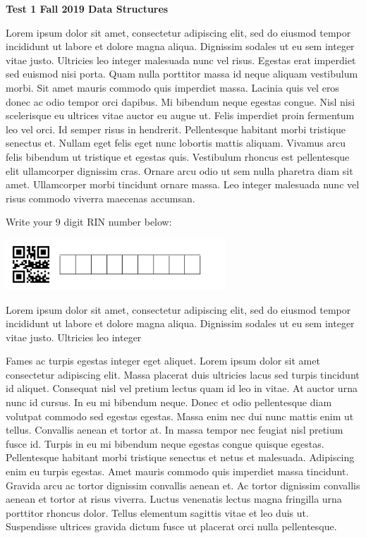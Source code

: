 \documentclass[12pt]{article}
\begin{document}
\newpage

\noindent
{\Large \bf Test 1 \hfill Fall 2019 Data Structures}

\vspace{0.1in}

Lorem ipsum dolor sit amet, consectetur adipiscing elit, sed do eiusmod tempor incididunt ut labore et dolore magna aliqua. Dignissim sodales ut eu sem integer vitae justo. Ultricies leo integer malesuada nunc vel risus. Egestas erat imperdiet sed euismod nisi porta. Quam nulla porttitor massa id neque aliquam vestibulum morbi. Sit amet mauris commodo quis imperdiet massa. Lacinia quis vel eros donec ac odio tempor orci dapibus. Mi bibendum neque egestas congue. Nisl nisi scelerisque eu ultrices vitae auctor eu augue ut. Felis imperdiet proin fermentum leo vel orci. Id semper risus in hendrerit. Pellentesque habitant morbi tristique senectus et. Nullam eget felis eget nunc lobortis mattis aliquam. Vivamus arcu felis bibendum ut tristique et egestas quis. Vestibulum rhoncus est pellentesque elit ullamcorper dignissim cras. Ornare arcu odio ut sem nulla pharetra diam sit amet. Ullamcorper morbi tincidunt ornare massa. Leo integer malesuada nunc vel risus commodo viverra maecenas accumsan.

\vspace{0.1in}
\noindent
\begin{minipage}{3in}
Write your 9 digit RIN number below:

\noindent
\includegraphics[height=0.75in]{blank_QR_numeric_id.png}
\end{minipage}
\hfill
\begin{minipage}{3.5in}
Lorem ipsum dolor sit amet, consectetur adipiscing elit, sed do
eiusmod tempor incididunt ut labore et dolore magna aliqua. Dignissim
sodales ut eu sem integer vitae justo. Ultricies leo integer
\end{minipage}

Fames ac turpis egestas integer eget aliquet. Lorem ipsum dolor sit amet consectetur adipiscing elit. Massa placerat duis ultricies lacus sed turpis tincidunt id aliquet. Consequat nisl vel pretium lectus quam id leo in vitae. At auctor urna nunc id cursus. In eu mi bibendum neque. Donec et odio pellentesque diam volutpat commodo sed egestas egestas. Massa enim nec dui nunc mattis enim ut tellus. Convallis aenean et tortor at. In massa tempor nec feugiat nisl pretium fusce id. Turpis in eu mi bibendum neque egestas congue quisque egestas. Pellentesque habitant morbi tristique senectus et netus et malesuada. Adipiscing enim eu turpis egestas. Amet mauris commodo quis imperdiet massa tincidunt. Gravida arcu ac tortor dignissim convallis aenean et. Ac tortor dignissim convallis aenean et tortor at risus viverra. Luctus venenatis lectus magna fringilla urna porttitor rhoncus dolor. Tellus elementum sagittis vitae et leo duis ut. Suspendisse ultrices gravida dictum fusce ut placerat orci nulla pellentesque.
\end{document}
